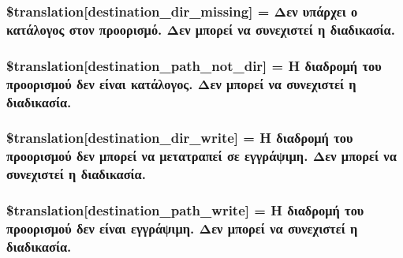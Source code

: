 \subsubsection[{\$translation}]{\setlength{\rightskip}{0pt plus 5cm}\$translation\mbox{[}\textquotesingle{}destination\+\_\+dir\+\_\+missing\textquotesingle{}\mbox{]} = \textquotesingle{}Δεν υπάρχει ο κατάλογος στον προορισμό. Δεν μπορεί να συνεχιστεί η διαδικασία.\textquotesingle{}}\label{class_8upload_8el___g_r_8php_a9ef28d3cf09942c6c0a1e77fa09185e8}
\hypertarget{class_8upload_8el___g_r_8php_a5704a67137126e8c87b7a364175929d4}{}
\subsubsection[{\$translation}]{\setlength{\rightskip}{0pt plus 5cm}\$translation\mbox{[}\textquotesingle{}destination\+\_\+path\+\_\+not\+\_\+dir\textquotesingle{}\mbox{]} = \textquotesingle{}Η διαδρομή του προορισμού δεν είναι κατάλογος. Δεν μπορεί να συνεχιστεί η διαδικασία.\textquotesingle{}}\label{class_8upload_8el___g_r_8php_a5704a67137126e8c87b7a364175929d4}
\hypertarget{class_8upload_8el___g_r_8php_a97608ea194a616db49141a0e6dee900c}{}
\subsubsection[{\$translation}]{\setlength{\rightskip}{0pt plus 5cm}\$translation\mbox{[}\textquotesingle{}destination\+\_\+dir\+\_\+write\textquotesingle{}\mbox{]} = \textquotesingle{}Η διαδρομή του προορισμού δεν μπορεί να μετατραπεί σε εγγράψιμη. Δεν μπορεί να συνεχιστεί η διαδικασία.\textquotesingle{}}\label{class_8upload_8el___g_r_8php_a97608ea194a616db49141a0e6dee900c}
\hypertarget{class_8upload_8el___g_r_8php_a40e4e1962226b89fd76da5819a9602b0}{}
\subsubsection[{\$translation}]{\setlength{\rightskip}{0pt plus 5cm}\$translation\mbox{[}\textquotesingle{}destination\+\_\+path\+\_\+write\textquotesingle{}\mbox{]} = \textquotesingle{}Η διαδρομή του προορισμού δεν είναι εγγράψιμη. Δεν μπορεί να συνεχιστεί η διαδικασία.\textquotesingle{}}\label{class_8upload_8el___g_r_8php_a40e4e1962226b89fd76da5819a9602b0}
\hypertarget{class_8upload_8el___g_r_8php_a2baece8da11e20d45175db91851ec3e3}{}
